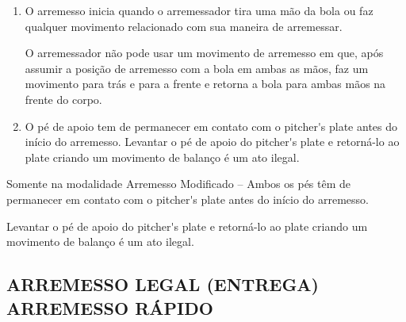 \begin{enumerate}[label=(\alph*)]
	\item O arremesso inicia quando o arremessador tira uma mão da bola ou faz qualquer movimento relacionado com sua maneira de arremessar.

	O arremessador não pode usar um movimento de arremesso em que, após assumir  a posição de arremesso com a bola em ambas as mãos, faz um movimento para trás e para a frente e retorna a bola para ambas mãos na frente do corpo.

	\item O pé de apoio tem de permanecer em contato com o \gls{pitcher's plate} antes do início do arremesso. Levantar o pé de apoio do \gls{pitcher's plate} e retorná-lo ao \gls{plate} criando um movimento de balanço é um ato ilegal.
\end{enumerate}

 	Somente na modalidade Arremesso Modificado -- Ambos os pés têm de  permanecer em contato com o \gls{pitcher's plate} antes do início do arremesso.

	Levantar o pé de apoio do \gls{pitcher's plate} e retorná-lo ao \gls{plate} criando um movimento de balanço é um ato ilegal.

\subsection{ARREMESSO LEGAL (ENTREGA) ARREMESSO RÁPIDO}

